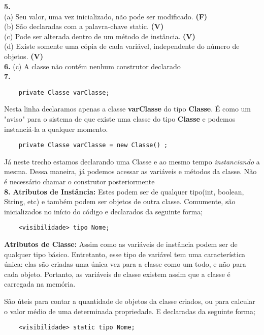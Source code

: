 \documentclass[a4paper, 12pt]{article}
\begin{document}
\textbf{5.} \\
(a) Seu valor, uma vez inicializado, não pode ser modificado. \textbf{(F)}\\
(b) São declaradas com a palavra-chave static. \textbf{(V)}\\
(c) Pode ser alterada dentro de um método de instância. \textbf{(V)}\\
(d) Existe somente uma cópia de cada variável, independente do número de objetos. \textbf{(V)}\\

\textbf{6.} (c) A classe não contém nenhum construtor declarado \\

\textbf{7.} \begin{lstlisting}
	private Classe varClasse;
\end{lstlisting}
Nesta linha declaramos apenas a classe \textbf{varClasse} do tipo \textbf{Classe}. É como um "aviso" para o sistema de que existe uma classe do tipo \textbf{Classe} e podemos instanciá-la a qualquer momento.\\
\begin{lstlisting}
	private Classe varClasse = new Classe() ;
\end{lstlisting}
Já neste trecho estamos declarando uma Classe e ao mesmo tempo \textit{instanciando} a mesma. Dessa maneira, já podemos acessar as variáveis e métodos da classe. Não é necessário chamar o construtor posteriormente\\

\textbf{8.} \textbf{Atributos de Instância: } Estes podem ser de qualquer tipo(int, boolean, String, etc) e também podem ser objetos de outra classe. 
Comumente, são inicializados no início do código e declarados da seguinte forma;
\begin{lstlisting}
	<visibilidade> tipo Nome;
\end{lstlisting}

\textbf{Atributos de Classe: }Assim como as variáveis de instância podem ser de qualquer tipo básico. Entretanto, esse tipo de variável tem uma característica única: elas são criadas uma única vez para a classe como um todo, e não para cada objeto. Portanto, as variáveis de classe existem assim que a classe é carregada na memória. 

São úteis para contar a quantidade de objetos da classe criados, ou para calcular o valor médio de uma determinada propriedade. E declaradas da seguinte forma;
\begin{lstlisting}
	<visibilidade> static tipo Nome;
\end{lstlisting}
\end{document}

